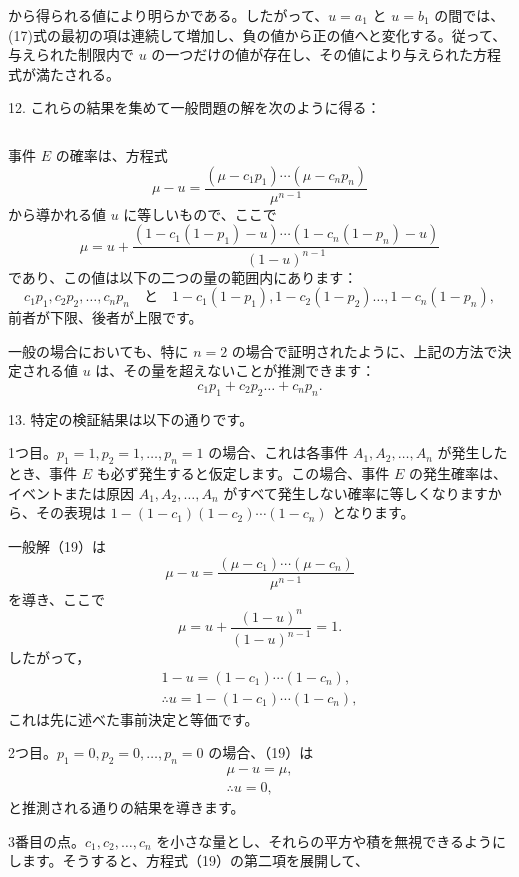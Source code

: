 \documentclass[a4paper,11pt,openany]{ltjsbook}
\begin{document}
から得られる値により明らかである。したがって、$u=a_1$ と $u=b_1$ の間では、(17)式の最初の項は連続して増加し、負の値から正の値へと変化する。従って、与えられた制限内で $u$ の一つだけの値が存在し、その値により与えられた方程式が満たされる。

12. これらの結果を集めて一般問題の解を次のように得る：

\begin{equation*}
\end{equation*}

事件 \(E\) の確率は、方程式
\[
\mu - u = \frac{(\mu - c_1 p_1) \cdots (\mu - c_n p_n)}{\mu^{n-1}}
\]
から導かれる値 \(u\) に等しいもので、ここで
\[
\mu = u + \frac{(1 - c_1 (1 - p_1) - u) \cdots (1 - c_n (1 - p_n) - u)}{(1 - u)^{n-1}}
\]
であり、この値は以下の二つの量の範囲内にあります：
\[
c_1 p_1, c_2 p_2, \ldots, c_n p_n \quad \text{と} \quad 1 - c_1 (1 - p_1), 1 - c_2 (1 - p_2) \ldots, 1 - c_n (1 - p_n),
\]
前者が下限、後者が上限です。

一般の場合においても、特に \(n = 2\) の場合で証明されたように、上記の方法で決定される値 \(u\) は、その量を超えないことが推測できます：
\[
c_1 p_1 + c_2 p_2 \ldots + c_n p_n.
\]

13. 特定の検証結果は以下の通りです。

1つ目。\(p_1 = 1, p_2 = 1, \ldots, p_n = 1\) の場合、これは各事件 \(A_1, A_2, \ldots, A_n\) が発生したとき、事件 \(E\) も必ず発生すると仮定します。この場合、事件 \(E\) の発生確率は、イベントまたは原因 \(A_1, A_2, \ldots, A_n\) がすべて発生しない確率に等しくなりますから、その表現は \(1 - (1 - c_1)(1 - c_2) \cdots (1 - c_n)\) となります。

一般解（19）は
\[
\mu - u = \frac{(\mu - c_1) \cdots (\mu - c_n)}{\mu^{n-1}}
\]
を導き、ここで
\[
\mu = u + \frac{(1 - u)^n}{(1 - u)^{n-1}} = 1.
\]
したがって，
\begin{gather*}
1 - u = (1 - c_1) \cdots (1 - c_n), \\
\therefore u = 1 - (1 - c_1) \cdots (1 - c_n),
\end{gather*}
これは先に述べた事前決定と等価です。

2つ目。\(p_1 = 0, p_2 = 0, \ldots, p_n = 0\) の場合、（19）は
\begin{gather*}
\mu - u = \mu, \\
\therefore u = 0,
\end{gather*}
と推測される通りの結果を導きます。

3番目の点。$c_1, c_2, \ldots, c_n$ を小さな量とし、それらの平方や積を無視できるようにします。そうすると、方程式（19）の第二項を展開して、
\end{document}
